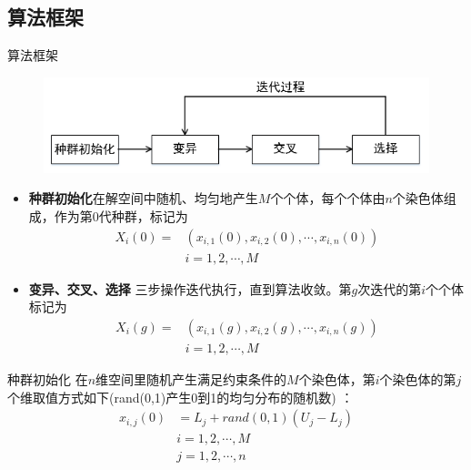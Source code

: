 \subsection{算法框架}
\begin{frame}{算法框架}\small
	\begin{figure}
		\includegraphics [width =1.0\textwidth]{../images/framework.png}
		\vspace{-1.2cm}
	\end{figure}
	\begin{itemize}
		\item {\bf 种群初始化}在解空间中随机、均匀地产生$M$个个体，每个个体由$n$个染色体组成，作为第$0$代种群，标记为
		\begin{equation*}
			\begin{split}
				X_i(0)=&\left(x_{i,1}(0),x_{i,2}(0),\cdots,x_{i,n}(0)\right)\\
				& i=1,2,\cdots,M
			\end{split}
		\end{equation*}
		\item {\bf 变异、交叉、选择 }三步操作迭代执行，直到算法收敛。第$g$次迭代的第$i$个个体标记为
		\begin{equation*}
			\begin{split}
				X_i(g)=&\left(x_{i,1}(g),x_{i,2}(g),\cdots,x_{i,n}(g)\right)\\
				& i=1,2,\cdots,M
			\end{split}
		\end{equation*}
	\end{itemize}
\end{frame}

\begin{frame}{种群初始化}
	在$n$维空间里随机产生满足约束条件的$M$个染色体，第$i$个染色体的第$j$个维取值方式如下(rand(0,1)产生0到1的均匀分布的随机数) ：
	\begin{equation*}
		\begin{split}
			x_{i,j}(0) &= L_j + rand(0,1)\left(U_j-L_j\right)\\
			& i = 1,2,\cdots,M\\
			& j = 1,2,\cdots,n\\
		\end{split}
	\end{equation*}
\end{frame}


